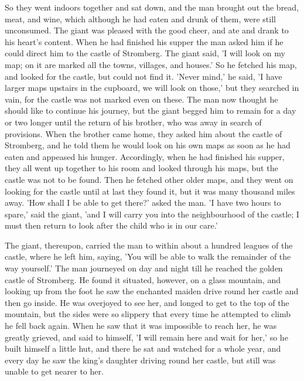 \documentclass[12pt]{book}
\begin{document}
So they went indoors together and sat down, and the man brought out
the bread, meat, and wine, which although he had eaten and drunk of
them, were still unconsumed. The giant was pleased with the good
cheer, and ate and drank to his heart's content. When he had finished
his supper the man asked him if he could direct him to the castle of
Stromberg. The giant said, 'I will look on my map; on it are marked
all the towns, villages, and houses.' So he fetched his map, and
looked for the castle, but could not find it. 'Never mind,' he said,
'I have larger maps upstairs in the cupboard, we will look on those,'
but they searched in vain, for the castle was not marked even on
these. The man now thought he should like to continue his journey, but
the giant begged him to remain for a day or two longer until the
return of his brother, who was away in search of provisions. When the
brother came home, they asked him about the castle of Stromberg, and
he told them he would look on his own maps as soon as he had eaten and
appeased his hunger. Accordingly, when he had finished his supper,
they all went up together to his room and looked through his maps, but
the castle was not to be found. Then he fetched other older maps, and
they went on looking for the castle until at last they found it, but
it was many thousand miles away. 'How shall I be able to get there?'
asked the man. 'I have two hours to spare,' said the giant, 'and I
will carry you into the neighbourhood of the castle; I must then
return to look after the child who is in our care.'

The giant, thereupon, carried the man to within about a hundred
leagues of the castle, where he left him, saying, 'You will be able to
walk the remainder of the way yourself.' The man journeyed on day and
night till he reached the golden castle of Stromberg. He found it
situated, however, on a glass mountain, and looking up from the foot
he saw the enchanted maiden drive round her castle and then go inside.
He was overjoyed to see her, and longed to get to the top of the
mountain, but the sides were so slippery that every time he attempted
to climb he fell back again. When he saw that it was impossible to
reach her, he was greatly grieved, and said to himself, 'I will remain
here and wait for her,' so he built himself a little hut, and there he
sat and watched for a whole year, and every day he saw the king's
daughter driving round her castle, but still was unable to get nearer
to her.
\end{document}
